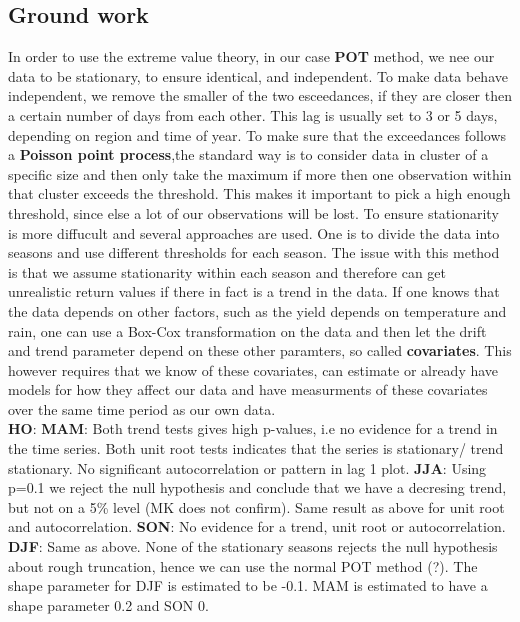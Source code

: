 \documentclass{article}
\begin{document}
	\subsection{Ground work}
	In order to use the extreme value theory, in our case \textbf{POT} method, we nee our data to be stationary, to ensure identical, and independent. To make data behave independent, we remove the smaller of the two esceedances, if they are closer then a certain number of days from each other. This lag is usually set to 3 or 5 days, depending on region and time of year. To make sure that the exceedances follows a \textbf{Poisson point process},the standard way is to consider data in cluster of a specific size and then only take the maximum if more then one observation within that cluster exceeds the threshold. This makes it important to pick a high enough threshold, since else a lot of our observations will be lost.
	To ensure stationarity is more diffucult and several approaches are used. One is to divide the data into seasons and use different thresholds for each season. The issue with this method is that we assume stationarity within each season and therefore can get unrealistic return values if there in fact is a trend in the data. If one knows that the data depends on other factors, such as the yield depends on temperature and rain, one can use a Box-Cox transformation on the data and then let the drift and trend parameter depend on these other paramters, so called \textbf{covariates}. This however requires that we know of these covariates, can estimate or already have models for how they affect our data and have measurments of these covariates over the same time period as our own data.\\
	
	{\Large\textbf{HO}}: \textbf{MAM}: Both trend tests gives high p-values, i.e no evidence for a trend in the time series. Both unit root tests indicates that the series is stationary/ trend stationary. No significant autocorrelation or pattern in lag 1 plot.
	\textbf{JJA}: Using p=0.1 we reject the null hypothesis and conclude that we have a decresing trend, but not on a 5\% level (MK does not confirm). Same result as above for unit root and autocorrelation.
	\textbf{SON}: No evidence for a trend, unit root or autocorrelation. 
	\textbf{DJF}: Same as above.
	None of the stationary seasons rejects the null hypothesis about rough truncation, hence we can use the normal POT method (?). The shape parameter for DJF is estimated to be -0.1. MAM is estimated to have a shape parameter 0.2 and SON 0.\\
	
\end{document}
